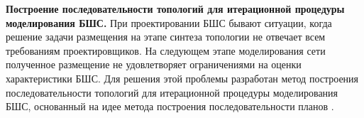 
    

\textbf{Построение последовательности топологий для итерационной процедуры моделирования БШС.}
При проектировании БШС бывают ситуации, когда решение задачи размещения на этапе синтеза топологии не отвечает всем требованиям проектировщиков. На следующем этапе моделирования сети полученное размещение не удовлетворяет ограничениями на оценки характеристики БШС. Для решения этой проблемы разработан метод построения последовательности топологий для итерационной процедуры моделирования БШС, основанный на идее метода построения последовательности планов \cite{Emelichev}.



